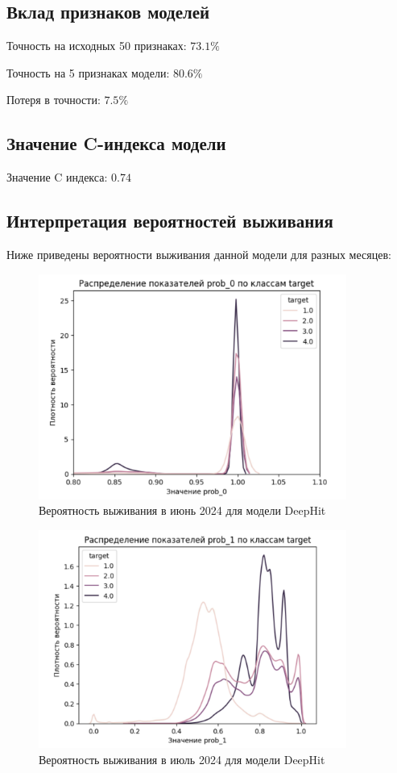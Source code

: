 \documentclass[a4paper,14pt,oneside,openany]{memoir}
\begin{document}
\subsection{Вклад признаков моделей}

Точность на исходных 50 признаках: $73.1\%$

Точность на 5 признаках модели: $80.6\%$

Потеря в точности: $7.5\%$


\subsection{Значение C-индекса модели}

Значение C индекса: $0.74$

\subsection{Интерпретация вероятностей выживания}

Ниже приведены вероятности выживания данной модели для разных месяцев: 

\begin{figure}[H]
	\includegraphics[width=0.9\textwidth]{../figures/prob_0_deephit.png}
	\caption{Вероятность выживания в июнь 2024 для модели DeepHit}
\end{figure}

\begin{figure}[H]
	\includegraphics[width=0.9\textwidth]{../figures/prob_1_deephit.png}
	\caption{Вероятность выживания в июль 2024 для модели DeepHit}
\end{figure}
\end{document}
